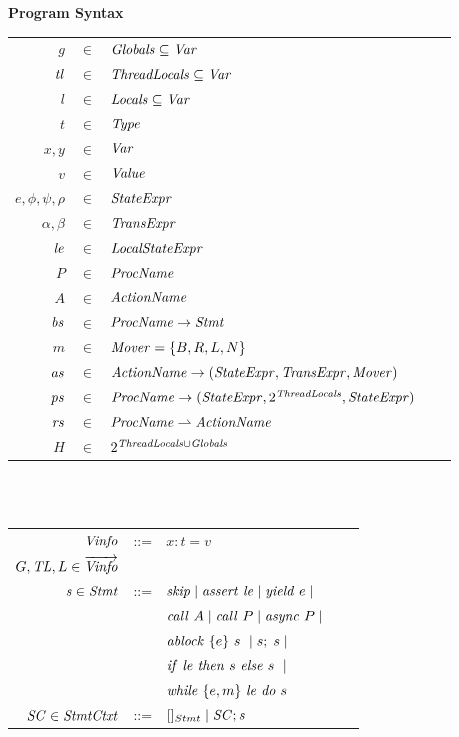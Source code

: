 \begin{figure}
\setlength{\tabcolsep}{3pt}
{\bf Program Syntax} \\
\begin{tabular}{rclcl}
$g$ & $\in$ & $\mathit{Globals} \subseteq \mathit{Var}$ \\
$\mathit{tl}$ & $\in$ & $\mathit{ThreadLocals} \subseteq \mathit{Var}$ \\
$l$ & $\in$ & $\mathit{Locals} \subseteq \mathit{Var}$ \\
$t$ & $\in$ & $\mathit{Type}$ \\
$x,y$ & $\in$ & $\mathit{Var}$ \\
$v$ &  $\in$ & $\mathit{Value}$ \\
$e, \phi, \psi, \rho$ & $\in$ & $\mathit{StateExpr}$ \\
$\alpha, \beta$ & $\in$ & $\mathit{TransExpr}$ \\
$\mathit{le}$ & $\in$ & $\mathit{LocalStateExpr}$ \\
$P$ & $\in$ & $\mathit{ProcName}$ \\
$A$ & $\in$ & $\mathit{ActionName}$ \\
$\mathit{bs}$ & $\in$ & $\mathit{ProcName} \rightarrow \mathit{Stmt}$ \\
$m$ & $\in$ & $\mathit{Mover} = \{B,R,L,N\}$\\
$\mathit{as}$ & $\in$ & $\mathit{ActionName} \rightarrow (\mathit{StateExpr}, \mathit{TransExpr}, \mathit{Mover})$ \\
$\mathit{ps}$ & $\in$ & $\mathit{ProcName} \rightarrow (\mathit{StateExpr}, 2^{\mathit{ThreadLocals}}, \mathit{StateExpr})$ \\
$\mathit{rs}$ & $\in$ & $\mathit{ProcName} \rightharpoonup \mathit{ActionName}$ \\
$H$ & $\in$ & $2^{\mathit{ThreadLocals} \cup \mathit{Globals}}$ \\
\end{tabular}
~\\
~\\
\begin{tabular}{rclcl}
$\mathit{Vinfo}$ &::= & $x:t=v$ \\
$G,\mathit{TL},L \in \overrightarrow{\mathit{Vinfo}}$ \\
$\mathit{s} \in \mathit{Stmt}$ &::= & $\mathit{skip} \mid \mathit{assert}\ \mathit{le} \mid \mathit{yield}\ e \mid$ \\
                  & & $\mathit{call}\ A \mid \mathit{call}\ P \mid \mathit{async}\ P \mid $\\
                  & & $\mathit{ablock}\ {\{e\}}\ {s}\  \mid s;\;s \mid$\\
                 & & ${\mathit{if}\ {\mathit{le}}\ }{\mathit{then}\ {s}\ }{\mathit{else}\ {s}\ } \mid$ \\
                  & & $\mathit{while}\ \{{e,m}\}\ {{\mathit{le}}\ } \mathit{do}\ {{s}\ }$ \\ 
$\mathit{SC} \in \mathit{StmtCtxt}$ &::= &$[]_{Stmt} \mid \mathit{SC};\mathit{s}$ \\

\end{tabular}
\end{figure}

